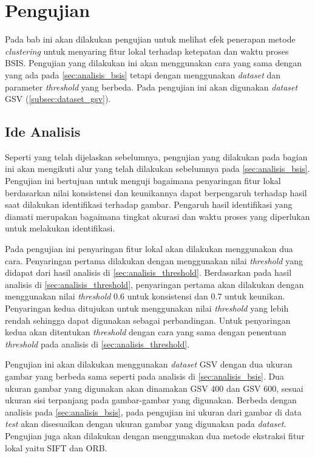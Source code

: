 \chapter{Pengujian}

Pada bab ini akan dilakukan pengujian untuk melihat efek penerapan metode \textit{clustering} untuk menyaring fitur lokal terhadap ketepatan dan waktu proses BSIS. Pengujian yang dilakukan ini akan menggunakan cara yang sama dengan yang ada pada \ref{sec:analisis_bsis} tetapi dengan menggunakan \textit{dataset} dan parameter \textit{threshold} yang berbeda. Pada pengujian ini akan digunakan \textit{dataset} GSV (\ref{subsec:dataset_gsv}).

\section{Ide Analisis}
Seperti yang telah dijelaskan sebelumnya, pengujian yang dilakukan pada bagian ini akan mengikuti alur yang telah dilakukan sebelumnya pada \ref{sec:analisis_bsis}. Pengujian ini bertujuan untuk menguji bagaimana penyaringan fitur lokal berdasarkan nilai konsistensi dan keunikannya dapat berpengaruh terhadap hasil saat dilakukan identifikasi terhadap gambar. Pengaruh hasil identifikasi yang diamati merupakan bagaimana tingkat akurasi dan waktu proses yang diperlukan untuk melakukan identifikasi.

Pada pengujian ini penyaringan fitur lokal akan dilakukan menggunakan dua cara. Penyaringan pertama dilakukan dengan menggunakan nilai \textit{threshold} yang didapat dari hasil analisis di \ref{sec:analisis_threshold}. Berdasarkan pada hasil analisis di \ref{sec:analisis_threshold}, penyaringan pertama akan dilakukan dengan menggunakan nilai \textit{threshold} 0.6 untuk konsistensi dan 0.7 untuk keunikan. Penyaringan kedua ditujukan untuk menggunakan nilai \textit{threshold} yang lebih rendah sehingga dapat digunakan sebagai perbandingan. Untuk penyaringan kedua akan ditentukan \textit{threshold} dengan cara yang sama dengan penentuan \textit{threshold} pada analisis di \ref{sec:analisis_threshold}. 

Pengujian ini akan dilakukan menggunakan \textit{dataset} GSV dengan dua ukuran gambar yang berbeda sama seperti pada analisis di \ref{sec:analisis_bsis}. Dua ukuran gambar yang digunakan akan dinamakan GSV 400 dan GSV 600, sesuai ukuran sisi terpanjang pada gambar-gambar yang digunakan. Berbeda dengan analisis pada \ref{sec:analisis_bsis}, pada pengujian ini ukuran dari gambar di data \textit{test} akan disesuaikan dengan ukuran gambar yang digunakan pada \textit{dataset}. Pengujian juga akan dilakukan dengan menggunakan dua metode ekstraksi fitur lokal yaitu SIFT dan ORB.


